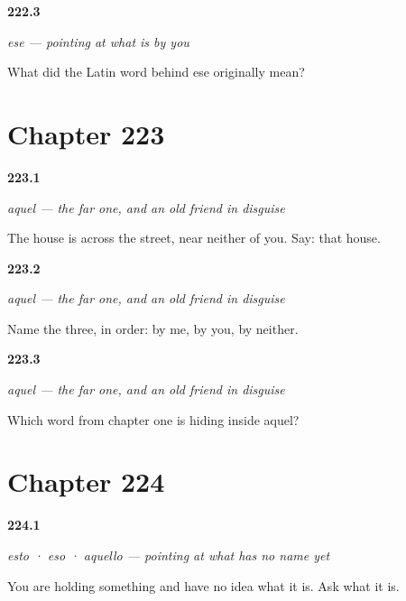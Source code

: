 \noindent\begin{minipage}[t]{\linewidth}
\raggedright
\hypertarget{review-ES-C59-ese-origin}{\textbf{222.3}} \emph{ese — pointing at what is by you}\par
\small What did the Latin word behind ese originally mean?
\end{minipage}\par\medskip

\section*{Chapter 223}

\noindent\begin{minipage}[t]{\linewidth}
\raggedright
\hypertarget{review-ES-C59-aquel-say}{\textbf{223.1}} \emph{aquel — the far one, and an old friend in disguise}\par
\small The house is across the street, near neither of you. Say: that house.
\end{minipage}\par\medskip

\noindent\begin{minipage}[t]{\linewidth}
\raggedright
\hypertarget{review-ES-C59-aquel-three}{\textbf{223.2}} \emph{aquel — the far one, and an old friend in disguise}\par
\small Name the three, in order: by me, by you, by neither.
\end{minipage}\par\medskip

\noindent\begin{minipage}[t]{\linewidth}
\raggedright
\hypertarget{review-ES-C59-aquel-ille}{\textbf{223.3}} \emph{aquel — the far one, and an old friend in disguise}\par
\small Which word from chapter one is hiding inside aquel?
\end{minipage}\par\medskip

\section*{Chapter 224}

\noindent\begin{minipage}[t]{\linewidth}
\raggedright
\hypertarget{review-ES-C59-esto-eso-aquello-ask}{\textbf{224.1}} \emph{esto · eso · aquello — pointing at what has no name yet}\par
\small You are holding something and have no idea what it is. Ask what it is.
\end{minipage}\par\medskip

